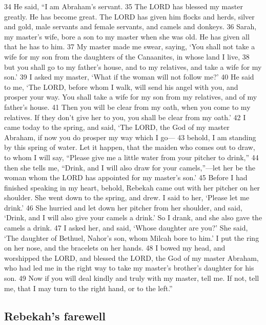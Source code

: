 {34} He said, ``I am Abraham's servant. {35} The LORD has blessed my
master greatly. He has become great. The LORD has given him flocks and
herds, silver and gold, male servants and female servants, and camels
and donkeys. {36} Sarah, my master's wife, bore a son to my master when
she was old. He has given all that he has to him. {37} My master made me
swear, saying, `You shall not take a wife for my son from the daughters
of the Canaanites, in whose land I live, {38} but you shall go to my
father's house, and to my relatives, and take a wife for my son.' {39} I
asked my master, `What if the woman will not follow me?' {40} He said to
me, `The LORD, before whom I walk, will send his angel with you, and
prosper your way. You shall take a wife for my son from my relatives,
and of my father's house. {41} Then you will be clear from my oath, when
you come to my relatives. If they don't give her to you, you shall be
clear from my oath.' {42} I came today to the spring, and said, `The
LORD, the God of my master Abraham, if now you do prosper my way which I
go--- {43} behold, I am standing by this spring of water. Let it happen,
that the maiden who comes out to draw, to whom I will say, ``Please give
me a little water from your pitcher to drink,'' {44} then she tells me,
``Drink, and I will also draw for your camels,''---let her be the woman
whom the LORD has appointed for my master's son.' {45} Before I had
finished speaking in my heart, behold, Rebekah came out with her pitcher
on her shoulder. She went down to the spring, and drew. I said to her,
`Please let me drink.' {46} She hurried and let down her pitcher from
her shoulder, and said, `Drink, and I will also give your camels a
drink.' So I drank, and she also gave the camels a drink. {47} I asked
her, and said, `Whose daughter are you?' She said, `The daughter of
Bethuel, Nahor's son, whom Milcah bore to him.' I put the ring on her
nose, and the bracelets on her hands. {48} I bowed my head, and
worshipped the LORD, and blessed the LORD, the God of my master Abraham,
who had led me in the right way to take my master's brother's daughter
for his son. {49} Now if you will deal kindly and truly with my master,
tell me. If not, tell me, that I may turn to the right hand, or to the
left.''

\hypertarget{rebekahs-farewell}{%
\subsection{Rebekah's farewell}\label{rebekahs-farewell}}


